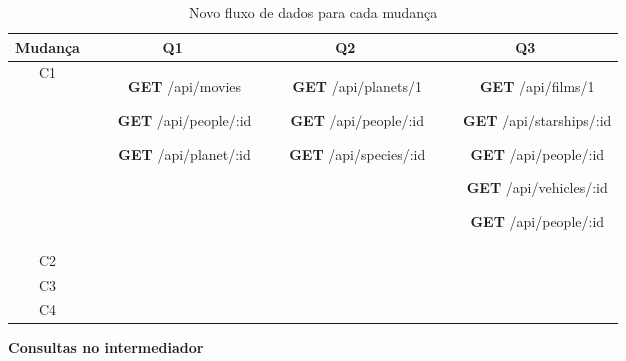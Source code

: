 \begin{table}[H]
  \centering
  \begin{tabular}{|c|c|c|c|}
    \hline
    Mudança & Q1 & Q2 & Q3 \\
    \hline
    C1 & \begin{minipage}[t]{0.3\textwidth}
      \begin{itemize}
        \item[\textbf{GET}] /api/movies
        \item[\textbf{GET}] /api/people/:id
        \item[\textbf{GET}] /api/planet/:id
      \end{itemize}
    \end{minipage} & \begin{minipage}[t]{0.3\textwidth}
      \begin{itemize}
        \item[\textbf{GET}] /api/planets/1
        \item[\textbf{GET}] /api/people/:id
        \item[\textbf{GET}] /api/species/:id
      \end{itemize}
    \end{minipage} & \begin{minipage}[t]{0.3\textwidth}
      \begin{itemize}
        \item[\textbf{GET}] /api/films/1
        \item[\textbf{GET}] /api/starships/:id
        \item[\textbf{GET}] /api/people/:id
        \item[\textbf{GET}] /api/vehicles/:id
        \item[\textbf{GET}] /api/people/:id
      \end{itemize}
    \end{minipage} \\
    \hline
    C2 \\
    \hline
    C3 \\
    \hline
    C4 \\
    \hline
  \end{tabular}
  \caption{Novo fluxo de dados para cada mudança}
\end{table}

\textbf{Consultas no intermediador} \\

